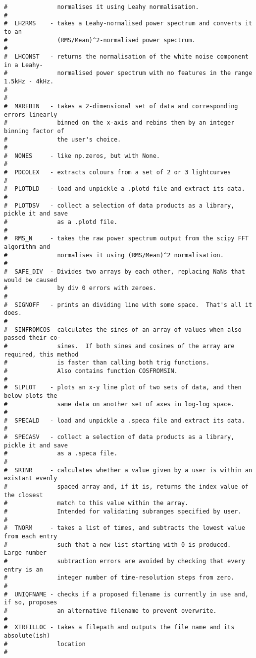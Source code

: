 \begin{verbatim}
#              normalises it using Leahy normalisation.
#
#  LH2RMS    - takes a Leahy-normalised power spectrum and converts it to an
#              (RMS/Mean)^2-normalised power spectrum.
#
#  LHCONST   - returns the normalisation of the white noise component in a Leahy-
#              normalised power spectrum with no features in the range 1.5kHz - 4kHz.
# 
#
#  MXREBIN   - takes a 2-dimensional set of data and corresponding errors linearly
#              binned on the x-axis and rebins them by an integer binning factor of
#              the user's choice.
#
#  NONES     - like np.zeros, but with None.
#
#  PDCOLEX   - extracts colours from a set of 2 or 3 lightcurves
#
#  PLOTDLD   - load and unpickle a .plotd file and extract its data.
#
#  PLOTDSV   - collect a selection of data products as a library, pickle it and save
#              as a .plotd file.
#
#  RMS_N     - takes the raw power spectrum output from the scipy FFT algorithm and
#              normalises it using (RMS/Mean)^2 normalisation.
#
#  SAFE_DIV  - Divides two arrays by each other, replacing NaNs that would be caused
#              by div 0 errors with zeroes.
#
#  SIGNOFF   - prints an dividing line with some space.  That's all it does.
#
#  SINFROMCOS- calculates the sines of an array of values when also passed their co-
#              sines.  If both sines and cosines of the array are required, this method
#              is faster than calling both trig functions.
#              Also contains function COSFROMSIN.
#
#  SLPLOT    - plots an x-y line plot of two sets of data, and then below plots the
#              same data on another set of axes in log-log space.
#
#  SPECALD   - load and unpickle a .speca file and extract its data.
# 
#  SPECASV   - collect a selection of data products as a library, pickle it and save
#              as a .speca file.
#
#  SRINR     - calculates whether a value given by a user is within an existant evenly
#              spaced array and, if it is, returns the index value of the closest
#              match to this value within the array.
#              Intended for validating subranges specified by user.
#
#  TNORM     - takes a list of times, and subtracts the lowest value from each entry
#              such that a new list starting with 0 is produced.  Large number
#              subtraction errors are avoided by checking that every entry is an
#              integer number of time-resolution steps from zero.
#
#  UNIQFNAME - checks if a proposed filename is currently in use and, if so, proposes
#              an alternative filename to prevent overwrite.
#
#  XTRFILLOC - takes a filepath and outputs the file name and its absolute(ish)
#              location
#


\end{verbatim}

